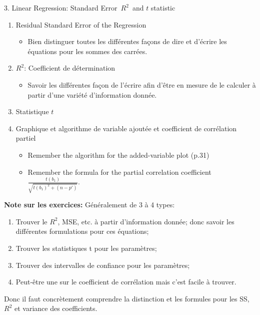 \documentclass[12pt, titlepage, french]{report}
\begin{document}
\begin{CHPT_SUMM}[label = {LM-STDERROR}]{3. Linear Regression: Standard Error\, $R^{2}$\, and $t$ statistic}
\begin{enumerate}
	\item	Residual Standard Error of the Regression
	\begin{itemize}
		\item	Bien distinguer toutes les différentes façons de dire et d'écrire les équations pour les sommes des carrées.
	\end{itemize}
	\item	$R^{2}$: Coefficient de détermination
	\begin{itemize}
		\item	Savoir les différentes façon de l'écrire afin d'être en mesure de le calculer à partir d'une variété d'information donnée.
	\end{itemize}
	\item	Statistique $t$
	\item	Graphique et algorithme de variable ajoutée et coefficient de corrélation partiel
	\begin{itemize}
		\item	Remember the algorithm for the added-variable plot (p.31)
		\item	Remember the formula for the partial correlation coefficient $\frac{t(b_{1})}{\sqrt{t(b_{1})^{2} + (n - p')}}$.
	\end{itemize}
\end{enumerate}
\textbf{Note sur les exercices:} Généralement de 3 à 4 types:
\begin{enumerate}
	\item	Trouver le $R^{2}$, MSE, etc. à partir d'information donnée; donc savoir les différentes formulations pour ces équations;
	\item	Trouver les statistiques t pour les paramètres;
	\item	Trouver des intervalles de confiance pour les paramètres;
	\item	Peut-être une sur le coefficient de corrélation mais c'est facile à trouver.
\end{enumerate}
Donc il faut concrètement comprendre la distinction et les formules pour les SS, $R^{2}$ et variance des coefficients.
\end{CHPT_SUMM}
\end{document}
